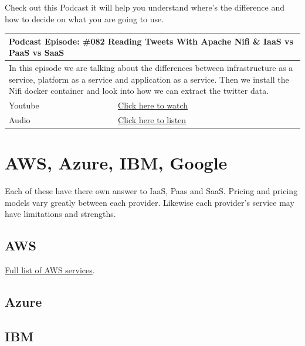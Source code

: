 \documentclass[12pt, numbers=noenddot]{scrreprt} %
\begin{document}
Check out this Podcast it will help you understand where's the difference and how to decide on what you are going to use.

\begin{table}[h]
\begin{tabular}{ll}
\hline
\multicolumn{2}{l}{\textbf{Podcast Episode:} \#082 Reading Tweets With Apache Nifi \& IaaS vs PaaS vs SaaS} \\ \hline
\multicolumn{2}{p{15cm}}{In this episode we are talking about the differences between infrastructure as a service, platform as a service and application as a service. Then we install the Nifi docker container and look into how we can extract the twitter data.}         \\ \hline
\multicolumn{1}{l|}{Youtube}   & \href{https://youtu.be/pWuT4UAocUY}{Click here to watch}   \\
\multicolumn{1}{l|}{Audio}     & \href{https://anchor.fm/andreaskayy/episodes/082-Reading-Tweets-With-Apache-Nifi--IaaS-vs-PaaS-vs-SaaS-e45j50}{Click here to listen}   \\ \hline
\end{tabular}
\end{table}


\section{AWS, Azure, IBM, Google}
Each of these have there own answer to IaaS, Paas and SaaS.  Pricing and pricing models vary greatly between each provider.  Likewise each provider's service may have limitations and strengths.  

\subsection{AWS}
\href{https://www.amazonaws.cn/en/products/}{Full list of AWS services}.

\subsection{Azure}

\subsection{IBM}
\end{document}
